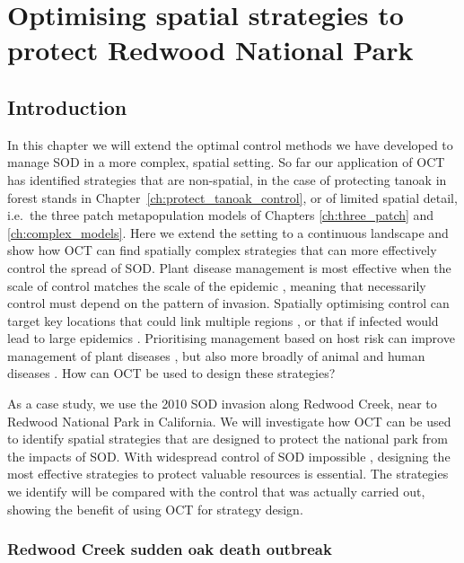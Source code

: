 %
\chapter{Optimising spatial strategies to protect Redwood National Park\label{ch:redwood}}

\section{Introduction}

In this chapter we will extend the optimal control methods we have developed to manage SOD in a more complex, spatial setting. So far our application of OCT has identified strategies that are non-spatial, in the case of protecting tanoak in forest stands in Chapter~\ref{ch:protect_tanoak_control}, or of limited spatial detail, i.e.\ the three patch metapopulation models of Chapters \ref{ch:three_patch} and \ref{ch:complex_models}. Here we extend the setting to a continuous landscape and show how OCT can find spatially complex strategies that can more effectively control the spread of SOD\@. Plant disease management is most effective when the scale of control matches the scale of the epidemic \citep{gilligan_epidemiological_2008, gilligan_impact_2007}, meaning that necessarily control must depend on the pattern of invasion. Spatially optimising control can target key locations that could link multiple regions \citep{minor_landscape_2011}, or that if infected would lead to large epidemics \citep{hyatt-twynam_risk-based_2017}. Prioritising management based on host risk can improve management of plant diseases \citep{cunniffe_modelling_2016}, but also more broadly of animal \citep{tildesley_optimal_2006} and human diseases \citep{fraser_factors_2004}. How can OCT be used to design these strategies?

As a case study, we use the 2010 SOD invasion along Redwood Creek, near to Redwood National Park in California. We will investigate how OCT can be used to identify spatial strategies that are designed to protect the national park from the impacts of SOD\@. With widespread control of SOD impossible \citep{cunniffe_modelling_2016}, designing the most effective strategies to protect valuable resources is essential. The strategies we identify will be compared with the control that was actually carried out, showing the benefit of using OCT for strategy design.

\subsection{Redwood Creek sudden oak death outbreak}

